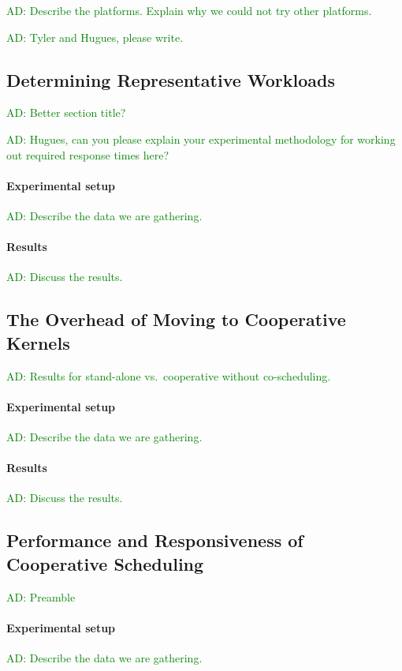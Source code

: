 \documentclass[numbers,nocopyrightspace,10pt]{sigplanconf}
\newcommand{\ADComment}[1]{\textcolor{green}{AD: #1}}
\begin{document}
\ADComment{Describe the platforms.  Explain why we could not try other
  platforms.}

\ADComment{Tyler and Hugues, please write.}

\subsection{Determining Representative Workloads}\label{sec:representativeworkloads}

\ADComment{Better section title?}

\ADComment{Hugues, can you please explain your experimental
  methodology for working out required response times here?}

\paragraph{Experimental setup}  \ADComment{Describe the data we are gathering.}

\paragraph{Results}  \ADComment{Discuss the results.}

\subsection{The Overhead of Moving to Cooperative Kernels}

\ADComment{Results for stand-alone vs.\ cooperative without co-scheduling.}

\paragraph{Experimental setup}  \ADComment{Describe the data we are gathering.}

\paragraph{Results}  \ADComment{Discuss the results.}

\subsection{Performance and Responsiveness of Cooperative Scheduling}\label{sec:responsiveness}

\ADComment{Preamble}

\paragraph{Experimental setup}  \ADComment{Describe the data we are gathering.}
\end{document}
